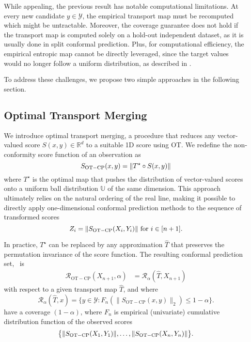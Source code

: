 \begin{remark} \label{rm:computationally_infeasible}
While appealing, the previous result has notable computational limitations.
At every new candidate $y \in \mathcal{Y}$, the empirical transport map must be recomputed which might be untractable. Moreover, the coverage guarantee does not hold if the transport map is computed solely on a hold-out independent dataset, as it is usually done in split conformal prediction.
Plus, for computational efficiency, the empirical entropic map cannot be directly leveraged, since the target values would no longer follow a uniform distribution, as described in .    
\end{remark}
To address these challenges, we propose two simple approaches in the following section.

\subsection{Optimal Transport Merging}

We introduce optimal transport merging, a procedure that reduces any vector-valued score $S(x, y) \in \mathbb{R}^d$ to a suitable 1D score using OT. We redefine the non-conformity score function of an observation as 
\begin{equation}\label{eq:otcp}
S_{\rm{OT-CP}}(x, y) =  \|T^\star \circ S(x, y)\|\end{equation}
where $T^\star$ is the optimal \citet{Bre91} map that pushes the distribution of vector-valued scores onto a uniform ball distribution $\mathbb{U}$ of the same dimension.
This approach ultimately relies on the natural ordering of the real line, making it possible to directly apply one-dimensional conformal prediction methods to the sequence of transformed scores 
$$Z_i = \|S_{\rm{OT-CP}}(X_i, Y_i)\| \text{ for } i \in [n+1] .$$

In practice, $T^\star$ can be replaced by any approximation $\hat T$ that preserves the permutation invariance of the score function.
The resulting conformal prediction set, \OTCP\, is
\begin{align*}
\mathcal{R}_{\mathrm{OT-CP}}(X_{n+1}, \alpha) &= \mathcal{R}_\alpha(\hat{T}, X_{n+1})
\end{align*}
with respect to a given transport map $\hat{T}$, and where
$$
\mathcal{R}_\alpha(\hat{T}, x) = 
\big\{y \in \mathcal{Y}: F_n(\|S_{\mathrm{OT-CP}}(x, y)\|_2)\leq 1-\alpha\big\}.
$$
have a coverage $(1-\alpha)$, where $F_n$ is empirical (univariate) cumulative distribution function of the observed scores $$\big\{\|S_{\rm{OT-CP}}(X_1, Y_1)\|, \ldots, \|S_{\rm{OT-CP}}(X_n, Y_n)\|\big\}.$$

